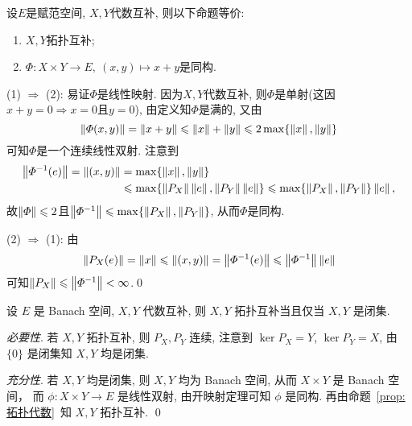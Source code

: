 \begin{Proposition}\label{prop:拓扑代数}
	设$ E $是赋范空间, $ X, Y $代数互补, 则以下命题等价:
	\begin{enumerate}[(1)]
		\item $ X, Y $拓扑互补;
		\item $ \varPhi : X\times Y\to E,\ (x,y)\mapsto x+y $是同构.
	\end{enumerate}
\end{Proposition}
\begin{Proof}
	(1) $ \Rightarrow $ (2): 易证$ \varPhi $是线性映射. 因为$ X, Y $代数互补, 则$ \varPhi $是单射(这因$ x+y=0\Longrightarrow x=0 $且$ y=0 $), 由定义知$ \varPhi $是满的, 又由
	\[
		\left\| \varPhi(x,y) \right\|=\left\| x+y \right\|\leqslant\left\| x \right\|+\left\| y \right\|\leqslant 2\max\{ \left\| x \right\|,\left\| y \right\| \}
	\]
	可知$ \varPhi $是一个连续线性双射. 注意到
	\[
		\begin{aligned}
			\left\| \varPhi^{-1}(e) \right\|=\left\| (x,y) \right\| & =\max\{ \left\| x \right\|,\left\| y \right\| \}                                                                               \\
			                                    & \leqslant\max\{ \left\| P_X \right\|\left\| e \right\|, \left\| P_Y \right\|\left\| e \right\| \}\leqslant\max\{ \left\| P_X \right\|,\left\| P_Y \right\| \}\left\| e \right\|,
		\end{aligned}
	\]
	故$ \left\| \varPhi \right\|\leqslant 2 $且$ \left\| \varPhi^{-1} \right\|\leqslant\max\{ \left\| P_X \right\|,\left\| P_Y \right\| \} $, 从而$ \varPhi $是同构.

	(2) $ \Rightarrow $ (1): 由
	\[
		\left\| P_X(e) \right\|=\left\| x \right\|\leqslant\left\| (x,y) \right\|=\left\| \varPhi^{-1}(e) \right\|\leqslant\left\| \varPhi^{-1} \right\|\left\| e \right\|
	\]
	可知$ \left\| P_X \right\|\leqslant\left\| \varPhi^{-1} \right\|<\infty $.\qed
\end{Proof}
\begin{Corollary}\label{cor:代数互补成为拓扑互补的条件}
	设 $ E $ 是 Banach 空间,  $ X, Y $ 代数互补, 则 $ X, Y $ 拓扑互补当且仅当 $ X, Y $ 是闭集.
\end{Corollary}
\begin{Proof}
	\textsl{必要性}. 若 $ X, Y $ 拓扑互补, 则 $ P_{X}, P_{Y} $ 连续, 注意到 $ \ker P_{X} = Y $,  $ \ker P_{Y}=X $, 由 $ \{0\} $ 是闭集知 $ X, Y $ 均是闭集.

	\textsl{充分性}.  若 $ X, Y $ 均是闭集, 则 $ X, Y $ 均为 Banach 空间, 从而 $ X\times Y $ 是 Banach 空间， 而 $ \phi : X\times Y\to E $ 是线性双射, 由开映射定理可知 $ \phi $ 是同构. 再由命题~\ref{prop:拓扑代数}~知 $ X, Y $ 拓扑互补. \qed
\end{Proof}

